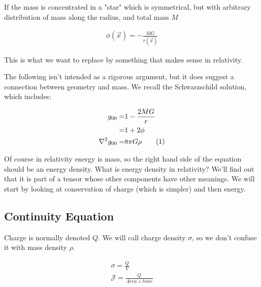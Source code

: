 \documentclass[]{article}
\newcommand\numberthis{\addtocounter{equation}{1}\tag{\theequation}}
\begin{document}
{If the mass is concentrated in a "star" which is symmetrical, but with arbitrary distribution of mass along the radius, and total mass $M$

\begin{align*}
	\phi(\vec{x}) = - \frac{MG}{r(\vec{x})}
\end{align*} 

This is what we want to replace by something that makes sense in relativity.

The following isn't intended as a rigorous argument, but it does suggest a connection between geometry and mass. We recall the Schwarzschild solution, which includes:

\begin{align*}
	g_{00} =& 1-\frac{2MG}{r}\\
	=& 1+2 \phi\\
	\nabla^2 g_{00} =& 8 \pi G \rho \numberthis \label{eq:incomplete:g:rho}
\end{align*}

Of course in relativity energy is mass, so the right hand side of the equation should be an energy density. What is energy density in relativity? We'll find out that it is part of a tensor whose other components have other meanings. We will start by looking at conservation of charge (which is simpler) and then energy.

\subsection{Continuity Equation}

Charge is normally denoted $Q$. We will call charge density $\sigma$, so we don't confuse it with mass density  $\rho$.

\begin{align*}
	\sigma = \frac{Q}{V}\\
	\mathscr{J} = \frac{Q}{Area\times time}
\end{align*}

}
\end{document}
